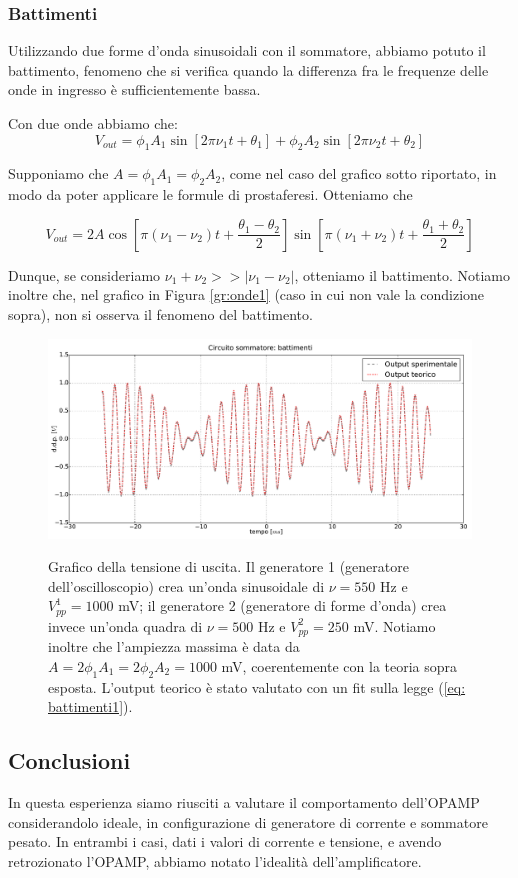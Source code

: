 \subsubsection{Battimenti}

Utilizzando due forme d'onda sinusoidali con il sommatore, abbiamo potuto il battimento, fenomeno che si verifica quando la differenza fra le frequenze delle onde in ingresso è sufficientemente bassa.

Con due onde abbiamo che:
\begin{equation}
V_{out}=\phi_1 A_1 \sin [2 \pi \nu_1 t + \theta_1] + \phi_2 A_2 \sin [2 \pi \nu_2 t + \theta_2]
\label{eq: battimenti1}
\end{equation}

Supponiamo che $A=\phi_1 A_1=\phi_2 A_2$, come nel caso del grafico sotto riportato, in modo da poter applicare le formule di prostaferesi. Otteniamo che

$$V_{out}=2A \cos \left[\pi (\nu_1 - \nu_2)t + \frac{\theta_1-\theta_2}{2}\right] \sin \left[\pi (\nu_1 + \nu_2) t + \frac{\theta_1+\theta_2}{2}\right]$$

Dunque, se consideriamo $\nu_1 + \nu_2 >> |\nu_1 - \nu_2|$, otteniamo il battimento. Notiamo inoltre che, nel grafico in Figura \ref{gr:onde1} (caso in cui non vale la condizione sopra), non si osserva il fenomeno del battimento.

\begin{figure}[ht]
 \centering
   {\includegraphics[width=17.5cm]{../E01/latex/battimenti_ideali.pdf}}
 \caption{Grafico della tensione di uscita. Il generatore 1 (generatore dell'oscilloscopio) crea un'onda sinusoidale di $\nu=550$ \si{\hertz} e $V^1_{pp}=1000$ \si{\milli\volt}; il generatore 2 (generatore di forme d'onda) crea invece un'onda quadra di $\nu=500$ \si{\hertz} e $V^2_{pp}=250$ \si{\milli\volt}. Notiamo inoltre che l'ampiezza massima è data da $A = 2 \phi_1 A_1 = 2 \phi_2 A_2 = 1000$ \si{\milli\volt}, coerentemente con la teoria sopra esposta. L'output teorico è stato valutato con un fit sulla legge (\ref{eq: battimenti1}).}
 \label{gr:battimenti}
\end{figure}

\subsection*{Conclusioni}

In questa esperienza siamo riusciti a valutare il comportamento dell'OPAMP considerandolo ideale, in configurazione di generatore di corrente e sommatore pesato. In entrambi i casi, dati i valori di corrente e tensione, e avendo retrozionato l'OPAMP, abbiamo notato l'idealità dell'amplificatore.